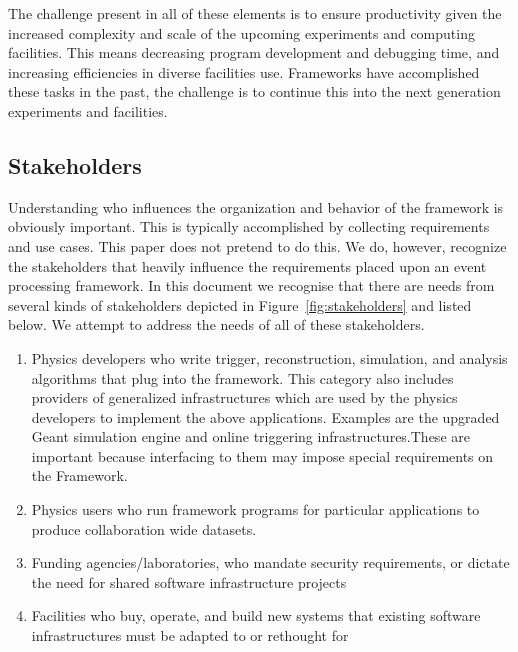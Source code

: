 \documentclass[12pt,a4paper]{article}
\begin{document}
The challenge present in all of these elements is to ensure
productivity given the increased complexity and scale of the upcoming
experiments and computing facilities. This means decreasing program
development and debugging time, and increasing efficiencies in diverse
facilities use.  Frameworks have accomplished these tasks in the past,
the challenge is to continue this into the next generation experiments
and facilities.

\subsection{Stakeholders}
\label{sec:stakeholders}

Understanding who influences the organization and behavior of the
framework is obviously important. This is typically accomplished by
collecting requirements and use cases. This paper does not pretend to
do this. We do, however, recognize the stakeholders that heavily
influence the requirements placed upon an event processing
framework. In this document we recognise that there are needs from
several kinds of stakeholders depicted in
Figure~\ref{fig:stakeholders} and listed below.  We attempt to address
the needs of all of these stakeholders.

\begin{enumerate}
\item
    Physics developers who write trigger, reconstruction, simulation,
    and analysis algorithms that plug into the framework. This
    category also includes providers of generalized infrastructures
    which are used by the physics developers to implement the above
    applications. Examples are the upgraded Geant simulation engine
    and online triggering infrastructures.These are important because
    interfacing to them may impose special requirements on the
    Framework.
\item
    Physics users who run framework programs for particular
    applications to produce collaboration wide datasets.
\item
    Funding agencies/laboratories, who mandate security requirements,
    or dictate the need for shared software infrastructure projects
\item
    Facilities who buy, operate, and build new systems that existing
    software infrastructures must be adapted to or rethought for
\end{enumerate}
\end{document}
